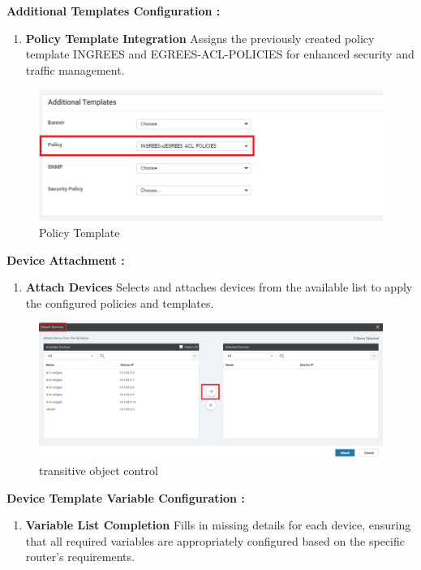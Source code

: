 \documentclass[12pt,english]{report}
\begin{document}
\textbf{Additional Templates Configuration :}
\begin{enumerate}
\item \textbf{Policy Template Integration}
Assigns the previously created policy template INGREES and EGREES-ACL-POLICIES for enhanced security and traffic management.
\end{enumerate}
\begin{figure}[H]
    \centering
    \includegraphics[width= 1 \textwidth]{chapitre 3/template/dt6.png}
    \caption{Policy Template}
    \label{Policy Template}
\end{figure}
\textbf{Device Attachment :}
\begin{enumerate}
\item \textbf{Attach Devices}
Selects and attaches devices from the available list to apply the configured policies and templates.
\end{enumerate}
\begin{figure}[H]
    \centering
    \includegraphics[width= 1 \textwidth]{chapitre 3/template/dt7.png}
    \caption{transitive object control}
    \label{transitive object control}
\end{figure}
\textbf{Device Template Variable Configuration :}
\begin{enumerate}
\item \textbf{Variable List Completion}
Fills in missing details for each device, ensuring that all required variables are appropriately configured based on the specific router's requirements.
\end{enumerate}
\end{document}
